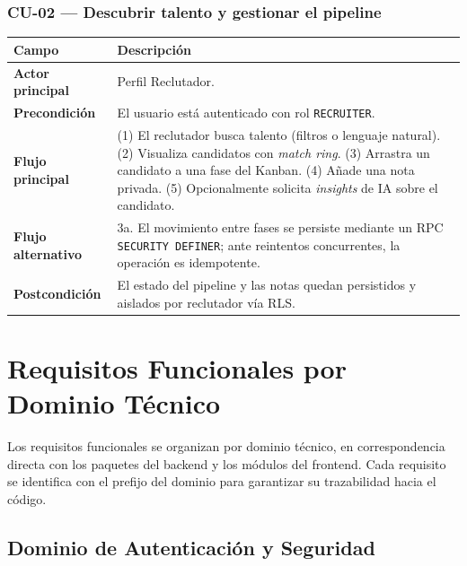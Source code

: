 \vspace{0.3cm}
\subsubsection*{CU-02 — Descubrir talento y gestionar el pipeline}

\noindent
\renewcommand{\arraystretch}{1.35}
\fontsize{9}{10.8}\selectfont\sffamily
\begin{tabularx}{\textwidth}{|>{\bfseries\color{colorPrimario}}L{3.2cm}|Y|}
\hline
{}
\textbf{Campo} & \textbf{Descripción} \\
\hline
Actor principal & Perfil Reclutador. \\
\hline
{}
Precondición & El usuario está autenticado con rol \texttt{RECRUITER}. \\
\hline
Flujo principal & (1) El reclutador busca talento (filtros o lenguaje natural). (2) Visualiza candidatos con \textit{match ring}. (3) Arrastra un candidato a una fase del Kanban. (4) Añade una nota privada. (5) Opcionalmente solicita \textit{insights} de IA sobre el candidato. \\
\hline
{}
Flujo alternativo & 3a. El movimiento entre fases se persiste mediante un RPC \texttt{SECURITY DEFINER}; ante reintentos concurrentes, la operación es idempotente. \\
\hline
Postcondición & El estado del pipeline y las notas quedan persistidos y aislados por reclutador vía RLS. \\
\hline
\end{tabularx}

\section{Requisitos Funcionales por Dominio Técnico}
\label{sec:rf}

Los requisitos funcionales se organizan por dominio técnico, en correspondencia
directa con los paquetes del backend y los módulos del frontend. Cada requisito se
identifica con el prefijo del dominio para garantizar su trazabilidad hacia el código.

\clearpage
\subsection{Dominio de Autenticación y Seguridad}
\label{subsec:rf_auth}

